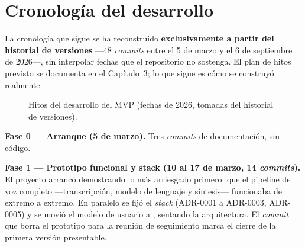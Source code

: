 \section{Cronología del desarrollo}
\label{sec:cronologia}

La cronología que sigue se ha reconstruido \textbf{exclusivamente a partir del historial de versiones}
---48 \emph{commits} entre el 5 de marzo y el 6 de septiembre de 2026---, sin interpolar fechas que el
repositorio no sostenga. El plan de hitos previsto se
documenta en el Capítulo~3; lo que sigue es cómo se construyó realmente.

\begin{figure}[htbp]\centering
\begingroup{}%
%
\endgroup
\caption{Hitos del desarrollo del MVP (fechas de 2026, tomadas del historial de versiones).}
\label{fig:hitos}
\end{figure}

\textbf{Fase 0 --- Arranque (5 de marzo).} Tres \emph{commits} de documentación, sin código.

\textbf{Fase 1 --- Prototipo funcional y stack (10 al 17 de marzo, 14 \emph{commits}).} El proyecto arrancó
demostrando lo más arriesgado primero: que el pipeline de voz completo ---transcripción, modelo de lenguaje
y síntesis--- funcionaba de extremo a extremo. En paralelo se fijó el \emph{stack} (ADR-0001 a ADR-0003,
ADR-0005) y se movió el modelo de usuario a , sentando la arquitectura. El \emph{commit} que
borra el prototipo para la reunión de seguimiento marca el cierre de la primera versión presentable.

